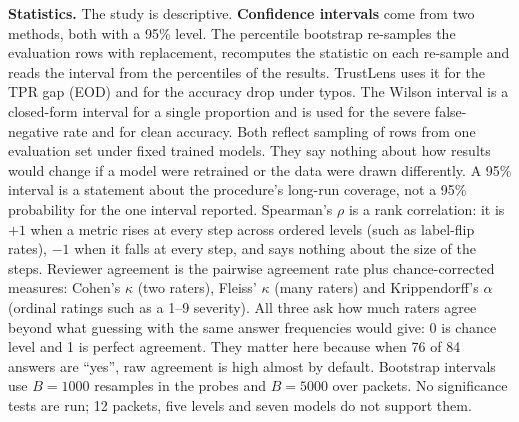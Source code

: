 \textbf{Statistics.} The study is descriptive. \textbf{Confidence intervals} come from two methods, both with a 95\% level. The percentile bootstrap \cite{efron1979} re-samples the evaluation rows with replacement, recomputes the statistic on each re-sample and reads the interval from the percentiles of the results. TrustLens uses it for the TPR gap (EOD) and for the accuracy drop under typos. The Wilson interval \cite{wilson1927} is a closed-form interval for a single proportion and is used for the severe false-negative rate and for clean accuracy. Both reflect sampling of rows from one evaluation set under fixed trained models. They say nothing about how results would change if a model were retrained or the data were drawn differently. A 95\% interval is a statement about the procedure's long-run coverage, not a 95\% probability for the one interval reported. Spearman's $\rho$ \cite{spearman1904} is a rank correlation: it is $+1$ when a metric rises at every step across ordered levels (such as label-flip rates), $-1$ when it falls at every step, and says nothing about the size of the steps. Reviewer agreement is the pairwise agreement rate plus chance-corrected measures: Cohen's $\kappa$ \cite{cohen1960} (two raters), Fleiss' $\kappa$ \cite{fleiss1971} (many raters) and Krippendorff's $\alpha$ \cite{krippendorff2004} (ordinal ratings such as a 1--9 severity). All three ask how much raters agree beyond what guessing with the same answer frequencies would give: 0 is chance level and 1 is perfect agreement. They matter here because when 76 of 84 answers are ``yes'', raw agreement is high almost by default. Bootstrap intervals use $B=1000$ resamples in the probes and $B=5000$ over packets. No significance tests are run; 12 packets, five levels and seven models do not support them.

